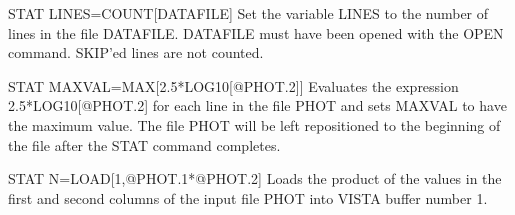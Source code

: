 \begin{example}
  \item[STAT LINES=COUNT{[DATAFILE]}\hfill]{ Set the variable LINES to the
       number of lines in the file DATAFILE.  DATAFILE must have been
       opened with the OPEN command.  SKIP'ed lines are not counted.}

  \item[STAT MAXVAL=MAX{[2.5*LOG10{[@PHOT.2]}]}\hfill]{ Evaluates the
       expression 2.5*LOG10{[@PHOT.2]} for each line in the file PHOT and
       sets MAXVAL to have the maximum value.  The file PHOT will be left
       repositioned to the beginning of the file after the STAT command
       completes.}

  \item[STAT N=LOAD{[1,@PHOT.1*@PHOT.2]}\hfill]{ Loads the product of the
       values in the first and second columns of the input file PHOT into
       VISTA buffer number 1.}
\end{example}

